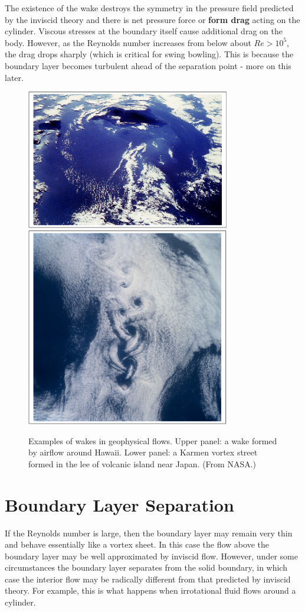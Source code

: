 \documentclass[twoside,a4paper,11pt]{report}
\begin{document}
The existence of the wake destroys the symmetry in the pressure field 
predicted by the inviscid theory and there is net pressure force or 
\textbf{form drag} acting on the cylinder. Viscous stresses at the boundary 
itself cause additional drag on the body. However, as the Reynolds number 
increases from below about $Re > 10^{5}$, the drag drops sharply (which is 
critical for swing bowling). This is because the boundary layer becomes 
turbulent ahead of the separation point - more on this later.

\begin{figure}[htbp]
\centerline{\includegraphics[width=3.5in]{Hawaii.jpg}}
\bigskip
\centerline{\includegraphics[width=3.5in]{island.jpg}}
{\bigskip}
\begin{center}
Examples of wakes in geophysical flows. Upper panel: a wake formed by airflow
around Hawaii. Lower panel: a Karmen vortex street formed in the lee of
volcanic island near Japan. {\small (From NASA.)}
\end{center}
\label{fig5}
\end{figure}

\section{Boundary Layer Separation}
If the Reynolds number is large, then the boundary layer may remain very 
thin and behave essentially like a vortex sheet. In this case the flow above 
the boundary layer may be well approximated by inviscid flow. However, under 
some circumstances the boundary layer separates from the solid boundary, in 
which case the interior flow may be radically different from that predicted 
by inviscid theory. For example, this is what happens when irrotational 
fluid flows around a cylinder. 
\end{document}
